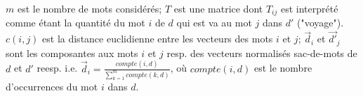 \begin{itemize}
	$m$ est le nombre de mots considérés; $T$ est une matrice dont $T_{ij}$ est interprété comme étant la quantité du mot $i$ de $d$ qui est va au mot $j$ dans $d'$ ("voyage"). $c(i,j)$ est la distance euclidienne entre les vecteurs des mots $i$ et $j$; $\vec{d}_i$ et $\vec{d'}_j$ sont les composantes aux mots $i$ et $j$ resp. des vecteurs normalisés sac-de-mots de $d$ et $d'$ reesp. i.e. $\vec{d}_i = \frac{compte(i, d)}{\sum\limits_{k=1}^m compte(k, d)}$, où $compte(i, d)$ est le nombre d'occurrences du mot $i$ dans $d$.
	
\end{itemize}


 

